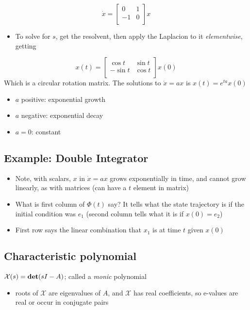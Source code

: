 \documentclass[10pt,letterpaper]{article}
\begin{document}
$$
\dot x =
\begin{bmatrix}
   0 & 1 \\
  -1 & 0 \\
\end{bmatrix}
x
$$ 
\begin{itemize}
\item To solve for $s$, get the resolvent, then apply the Laplacion to it \emph{elementwise}, getting
\end{itemize}
$$
x(t) =
\begin{bmatrix}
  \cos t  & \sin t \\
  -\sin t & \cos t \\
\end{bmatrix}
x(0)
$$
Which is a circular rotation matrix. The solutions to $\dot x = ax$ is $x(t) = e ^{ta} x(0)$
\begin{itemize}
\item $a$ positive: exponential growth
\item $a$ negative: exponential decay
\item $a=0$: constant
\end{itemize}
\subsection{Example: Double Integrator}
\label{sec-9_3}

\begin{itemize}
\item Note, with scalars, $x$ in $\dot x=ax$ grows exponentially in time, and cannot grow linearly, as with matrices (can have a $t$ element in matrix)
\item What is first column of $\Phi(t)$ say? It tells what the state trajectory is if the initial condition was $e_1$ (second column tells what it is if $x(0)= e_2$)
\item First row says the linear combination that $x_1$ is at time $t$ given $x(0)$
\end{itemize}
\subsection{Characteristic polynomial}
\label{sec-9_4}

$\mathcal X(s) = {\bf det} (sI-A)$; called a \emph{monic} polynomial
\begin{itemize}
\item roots of $\mathcal X$ are eigenvalues of $A$, and $\mathcal X$ has real coefficients, so e-values are real or occur in conjugate pairs
\end{itemize}
\end{document}
